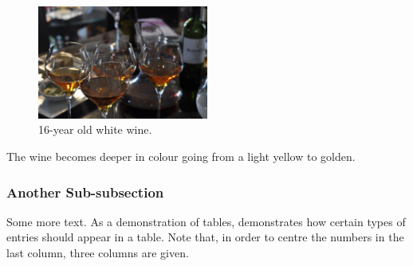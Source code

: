 \documentclass{ece}
\begin{document}
\begin{figure}[ht!] %
    \centering \includegraphics[width=0.5\textwidth]{wine}
    \caption{16-year old white wine.}
    \label{fig:wine}
\end{figure}

The wine becomes deeper in colour going from a light yellow to golden.
\subsubsection{Another Sub-subsection}

Some more text.  As a demonstration of tables,  demonstrates how certain types of entries should appear in a table.  Note that, in order to centre the numbers in the last column, three columns are given.
\end{document}
